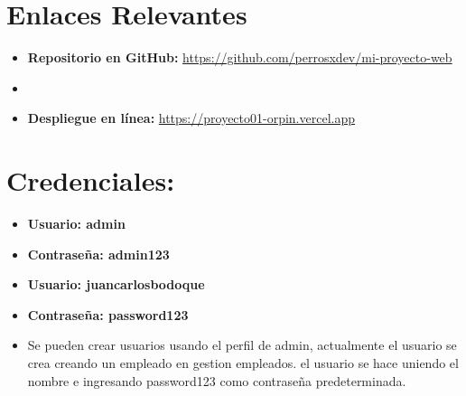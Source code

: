 \documentclass[12pt]{article}
\begin{document}
\section*{Enlaces Relevantes}
\begin{itemize}
  \item \textbf{Repositorio en GitHub:} \url{https://github.com/perrosxdev/mi-proyecto-web}
  \item \item \textbf{Despliegue en línea:} \href{https://proyecto01-orpin.vercel.app/}{https://proyecto01-orpin.vercel.app}
\end{itemize}
\section{Credenciales:}
\begin{itemize}
    \item \textbf{Usuario: admin}
    \item \textbf{Contraseña: admin123}
    \item \textbf{Usuario: juancarlosbodoque}
    \item \textbf{Contraseña: password123}
    \item Se pueden crear usuarios usando el perfil de admin, actualmente el usuario se crea creando un empleado en gestion empleados. el usuario se hace uniendo el nombre e ingresando password123 como contraseña predeterminada.
  
\end{itemize}
\end{document}
